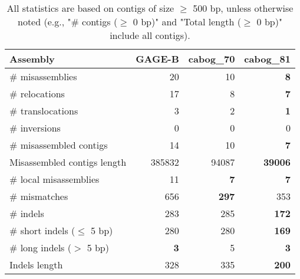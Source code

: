 \documentclass[12pt,a4paper]{article}
\begin{document}
\begin{table}[ht]
\begin{center}
\caption{All statistics are based on contigs of size $\geq$ 500 bp, unless otherwise noted (e.g., "\# contigs ($\geq$ 0 bp)" and "Total length ($\geq$ 0 bp)" include all contigs).}
\begin{tabular}{|l*{3}{|r}|}
\hline
Assembly & GAGE-B & cabog\_70 & cabog\_81 \\ \hline
\# misassemblies & 20 & 10 & {\bf 8} \\ \hline
\hspace{5mm}\# relocations & 17 & 8 & {\bf 7} \\ \hline
\hspace{5mm}\# translocations & 3 & 2 & {\bf 1} \\ \hline
\hspace{5mm}\# inversions & 0 & 0 & 0 \\ \hline
\# misassembled contigs & 14 & 10 & {\bf 7} \\ \hline
Misassembled contigs length & 385832 & 94087 & {\bf 39006} \\ \hline
\# local misassemblies & 11 & {\bf 7} & {\bf 7} \\ \hline
\# mismatches & 656 & {\bf 297} & 353 \\ \hline
\# indels & 283 & 285 & {\bf 172} \\ \hline
\hspace{5mm}\# short indels ($\leq$ 5 bp) & 280 & 280 & {\bf 169} \\ \hline
\hspace{5mm}\# long indels ($>$ 5 bp) & {\bf 3} & 5 & {\bf 3} \\ \hline
Indels length & 328 & 335 & {\bf 200} \\ \hline
\end{tabular}
\end{center}
\end{table}
\end{document}
